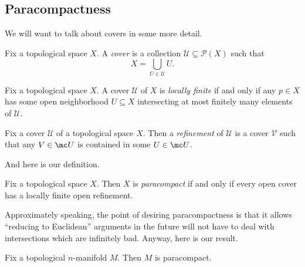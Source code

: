 \documentclass[../notes.tex]{subfiles}
\begin{document}
\subsection{Paracompactness}
We will want to talk about covers in some more detail.
\begin{definition}[cover]
	Fix a topological space $X$. A \textit{cover} is a collection $\mathcal U\subseteq\mathcal P(X)$ such that
	\[X=\bigcup_{U\in\mathcal U}U.\]
\end{definition}
\begin{definition}
	Fix a topological space $X$. A cover $\mathcal U$ of $X$ is \textit{locally finite} if and only if any $p\in X$ has some open neighborhood $U\subseteq X$ intersecting at most finitely many elements of $\mathcal U$.
\end{definition}
\begin{definition}[refinement]
	Fix a cover $\mathcal U$ of a topological space $X$. Then a \textit{refinement} of $\mathcal U$ is a cover $\mathcal V$ such that any $V\in\mc U$ is contained in some $U\in\mc U$.
\end{definition}
And here is our definition.
\begin{definition}[paracompact]
	Fix a topological space $X$. Then $X$ is \textit{paracompact} if and only if every open cover has a locally finite open refinement.
\end{definition}
Approximately speaking, the point of desiring paracompactness is that it allows ``reducing to Euclidean'' arguments in the future will not have to deal with intersections which are infinitely bad. Anyway, here is our result.
\begin{proposition}
	Fix a topological $n$-manifold $M$. Then $M$ is paracompact.
\end{proposition}
\end{document}
